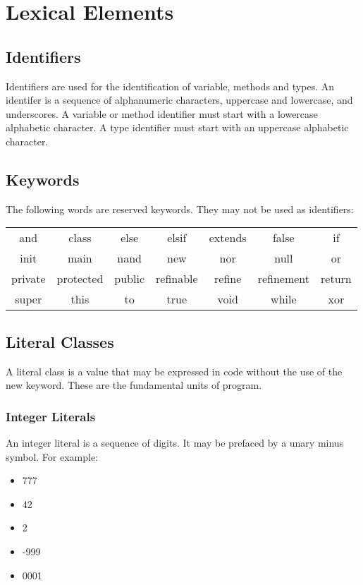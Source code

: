 \section{Lexical Elements}
\subsection{Identifiers}
Identifiers are used for the identification of variable,  methods and types. An identifer is a sequence of alphanumeric characters, uppercase and lowercase, and underscores. A variable or method identifier must start with a lowercase alphabetic character. A type identifier must start with an uppercase alphabetic character.

\subsection{Keywords}
The following words are reserved keywords. They may not be used as identifiers:
\begin{center}
\begin{tabular}{ccccccc}
and & class & else & elsif & extends & false & if\\
init & main & nand & new & nor & null & or\\
private & protected & public & refinable & refine & refinement & return\\
super & this & to & true & void & while & xor\\
\end{tabular}
\end{center}

\subsection{Literal Classes}
A literal class is a value that may be expressed in code without the use of the new keyword. These are the fundamental units of program.

\subsubsection{Integer Literals}
An integer literal is a sequence of digits. It may be prefaced by a unary minus symbol. For example:
\begin{itemize}
\item 777
\item 42
\item 2
\item -999
\item 0001
\end{itemize}

